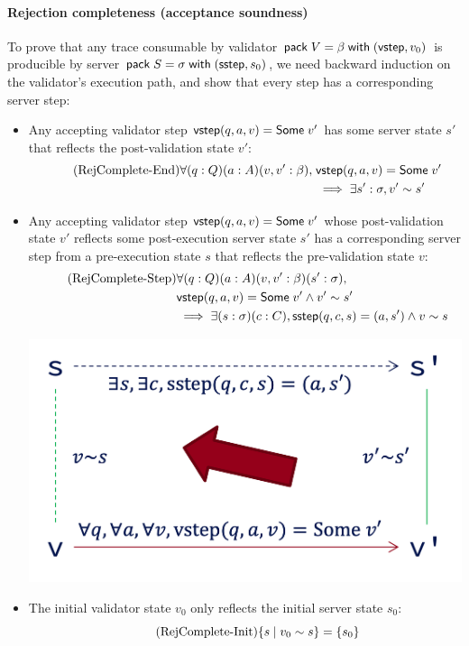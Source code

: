 \paragraph{Rejection completeness (acceptance soundness)}
To prove that any trace consumable by validator
$\mathsf{pack}\;V=\beta\;\mathsf{with}\;(\mathsf{vstep},v_0)$ is producible by server
$\mathsf{pack}\;S=\sigma\;\mathsf{with}\;(\mathsf{sstep},s_0)$, we need backward induction on the
validator's execution path, and show that every step has a corresponding server
step:
\begin{itemize}
\item Any accepting validator step $\mathsf{vstep}(q,a,v)=\mathsf{Some}\;v'$ has some server
  state $s'$ that reflects the post-validation state $v'$:
  \begin{align*}
    \tag{RejComplete-End}
    \label{eq:rc1}
    \forall(q:Q)(a:A)(v, v':\beta),\;&\mathsf{vstep}(q,a,v)=\mathsf{Some}\;v'\\
    &\implies\exists s':\sigma,v'\sim s' 
  \end{align*}
\item Any accepting validator step $\mathsf{vstep}(q,a,v)=\mathsf{Some}\;v'$ whose
  post-validation state $v'$ reflects some post-execution server state $s'$
  has a corresponding server step from a pre-execution state $s$
  that reflects the pre-validation state $v$:
  \begin{align*}
    \tag{RejComplete-Step}
    \label{eq:rc2}
    &\forall(q:Q)(a:A)(v,v':\beta)(s':\sigma),\\
    &\mathsf{vstep}(q,a,v)=\mathsf{Some}\;v'\wedge v'\sim s'\\
    &\implies\exists(s:\sigma)(c:C),\mathsf{sstep}(q,c,s)=(a,s')\wedge v\sim s
  \end{align*}
  \begin{center}
    \includegraphics[width=.5\textwidth]{figures/complete}
  \end{center}

\item The initial validator state $v_0$ only reflects the initial server state $s_0$:
  \begin{equation}
    \tag{RejComplete-Init}
    \label{eq:rc3}
    \{s\mid v_0\sim s\}=\{s_0\}
  \end{equation}
\end{itemize}

